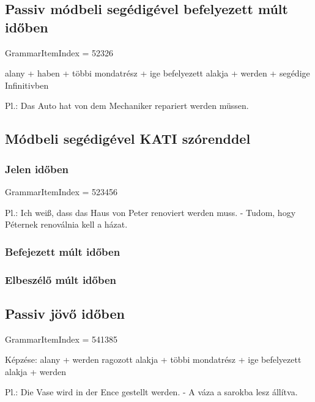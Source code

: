 \documentclass{article}
\newenvironment{desc}{\verbatim}{\endverbatim}
\begin{document}
\subsection{Passiv módbeli segédigével befelyezett múlt időben}

GrammarItemIndex = 52326

\begin{desc}
alany + haben + többi mondatrész + ige befelyezett alakja + werden + segédige Infinitivben

Pl.: Das Auto hat von dem Mechaniker repariert werden müssen.
\end{desc}

\subsection{Módbeli segédigével KATI szórenddel}

\subsubsection{Jelen időben}

GrammarItemIndex = 523456

\begin{desc}
Pl.: Ich weiß, dass das Haus von Peter renoviert werden muss. - Tudom, hogy Péternek renoválnia kell a házat.
\end{desc}

\subsubsection{Befejezett múlt időben}

\subsubsection{Elbeszélő múlt időben}

\subsection{Passiv jövő időben}

GrammarItemIndex = 541385

\begin{desc}
Képzése:
alany + werden ragozott alakja + többi mondatrész + ige befelyezett alakja + werden

Pl.: Die Vase wird in der Ence gestellt werden. - A váza a sarokba lesz állítva.
\end{desc}
\end{document}
